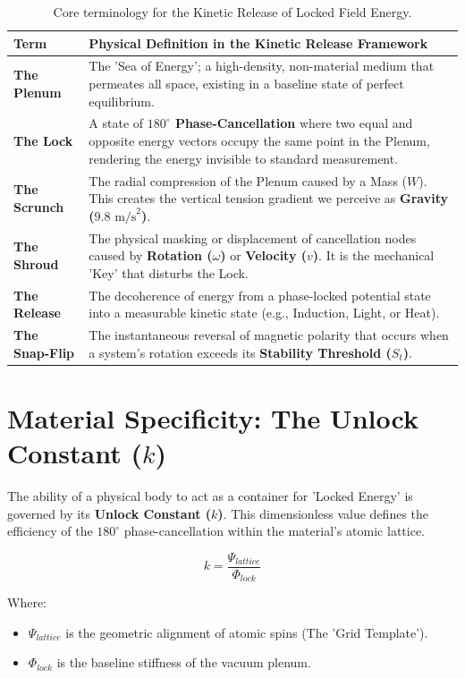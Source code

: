 \documentclass[11pt]{article}
\begin{document}
\begin{table}[h!]
\centering
\begin{tabular}{|p{3cm}|p{10cm}|}
\hline
\textbf{Term} & \textbf{Physical Definition in the Kinetic Release Framework} \\ \hline
\textbf{The Plenum} & The 'Sea of Energy'; a high-density, non-material medium that permeates all space, existing in a baseline state of perfect equilibrium. \\ \hline
\textbf{The Lock} & A state of \textbf{$180^\circ$ Phase-Cancellation} where two equal and opposite energy vectors occupy the same point in the Plenum, rendering the energy invisible to standard measurement. \\ \hline
\textbf{The Scrunch} & The radial compression of the Plenum caused by a Mass ($W$). This creates the vertical tension gradient we perceive as \textbf{Gravity ($9.8 \text{ m/s}^2$)}. \\ \hline
\textbf{The Shroud} & The physical masking or displacement of cancellation nodes caused by \textbf{Rotation ($\omega$)} or \textbf{Velocity ($v$)}. It is the mechanical 'Key' that disturbs the Lock. \\ \hline
\textbf{The Release} & The decoherence of energy from a phase-locked potential state into a measurable kinetic state (e.g., Induction, Light, or Heat). \\ \hline
\textbf{The Snap-Flip} & The instantaneous reversal of magnetic polarity that occurs when a system's rotation exceeds its \textbf{Stability Threshold ($S_t$)}. \\ \hline
\end{tabular}
\caption{Core terminology for the Kinetic Release of Locked Field Energy.}
\end{table}

\section*{Material Specificity: The Unlock Constant ($k$)}
The ability of a physical body to act as a container for 'Locked Energy' is governed by its \textbf{Unlock Constant ($k$)}. This dimensionless value defines the efficiency of the $180^\circ$ phase-cancellation within the material's atomic lattice.

\begin{equation}
    k = \frac{\Psi_{lattice}}{\Phi_{lock}}
\end{equation}

Where:
\begin{itemize}
    \item $\Psi_{lattice}$ is the geometric alignment of atomic spins (The 'Grid Template').
    \item $\Phi_{lock}$ is the baseline stiffness of the vacuum plenum.
\end{itemize}
\end{document}
